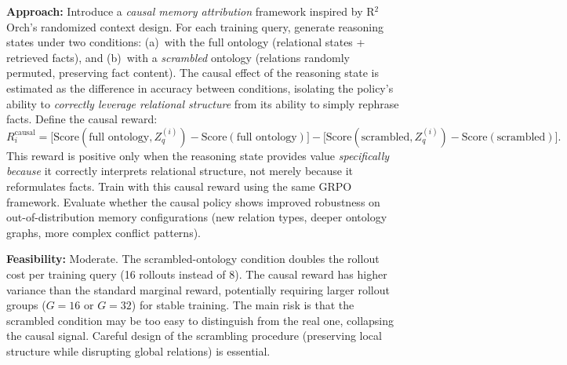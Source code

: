 \documentclass[11pt,a4paper]{article}
\begin{document}
\textbf{Approach:} Introduce a \emph{causal memory attribution} framework inspired by R$^2$Orch's randomized context design. For each training query, generate reasoning states under two conditions: (a)~with the full ontology (relational states + retrieved facts), and (b)~with a \emph{scrambled} ontology (relations randomly permuted, preserving fact content). The causal effect of the reasoning state is estimated as the difference in accuracy between conditions, isolating the policy's ability to \emph{correctly leverage relational structure} from its ability to simply rephrase facts. Define the causal reward:
\begin{equation}
  R_i^{\mathrm{causal}} = \bigl[\mathrm{Score}(\text{full ontology}, Z_q^{(i)}) - \mathrm{Score}(\text{full ontology})\bigr] - \bigl[\mathrm{Score}(\text{scrambled}, Z_q^{(i)}) - \mathrm{Score}(\text{scrambled})\bigr].
\end{equation}
This reward is positive only when the reasoning state provides value \emph{specifically because} it correctly interprets relational structure, not merely because it reformulates facts. Train with this causal reward using the same GRPO framework. Evaluate whether the causal policy shows improved robustness on out-of-distribution memory configurations (new relation types, deeper ontology graphs, more complex conflict patterns).

\textbf{Feasibility:} Moderate. The scrambled-ontology condition doubles the rollout cost per training query (16 rollouts instead of 8). The causal reward has higher variance than the standard marginal reward, potentially requiring larger rollout groups ($G{=}16$ or $G{=}32$) for stable training. The main risk is that the scrambled condition may be too easy to distinguish from the real one, collapsing the causal signal. Careful design of the scrambling procedure (preserving local structure while disrupting global relations) is essential.
\end{document}
